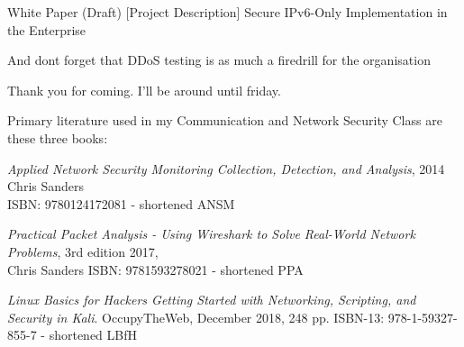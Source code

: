 \documentclass[Screen16to9,17pt]{foils}
\begin{document}


\begin{quote}

\end{quote}

\begin{list2}
    \item
\end{list2}



\slide{}


\begin{quote}

\end{quote}

\begin{list2}
    \item
\end{list2}

White Paper (Draft)
[Project Description] Secure IPv6-Only Implementation in the Enterprise





\begin{list1}
\item
\end{list1}

\centerline{And dont forget that DDoS testing is as much a firedrill for the organisation}

\vskip 1cm
Thank you for coming. I'll be around until friday.

\myquestionspage


Primary literature used in my Communication and Network Security Class
are these three books:
\begin{list2}
\item \emph{Applied Network Security Monitoring Collection, Detection, and Analysis}, 2014 Chris Sanders \\
ISBN: 9780124172081 - shortened ANSM
\item \emph{Practical Packet Analysis - Using Wireshark to Solve Real-World Network Problems}, 3rd edition 2017, \\
Chris Sanders ISBN: 9781593278021 - shortened PPA
\item \emph{Linux Basics for Hackers Getting Started with Networking, Scripting, and Security in Kali}. OccupyTheWeb, December 2018, 248 pp. ISBN-13: 978-1-59327-855-7 - shortened LBfH
\end{list2}
\end{document}
